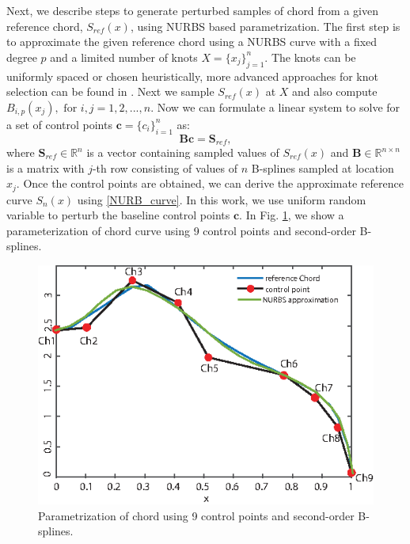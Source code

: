 \documentclass[review]{elsarticle}
\numberwithin{equation}{section}
\numberwithin{equation}{section}
\begin{document}
Next, we describe steps to generate perturbed samples of chord from a given reference chord, $S_{ref}(x)$, using NURBS based parametrization. The first step is to approximate the given reference chord using a NURBS curve with a fixed degree $p$ and a limited number of knots $X =\{x_j\}_{j=1}^n$. The knots can be uniformly spaced or chosen heuristically, more advanced approaches for knot selection can be found in \cite{LI2005791,razdan1999knot}. Next we sample $S_{ref}(x)$ at $X$ and also compute $B_{i,p}(x_j), \text{ for }i, j = 1,2, ..., n$. Now we can formulate a linear system to solve for a set of control points $\mathbf{c}=\{c_i\}_{i=1}^n$ as:
\begin{equation}\label{nurbs_inversion}
\mathbf{B}\mathbf{c} = \mathbf{S}_{ref},
\end{equation}
where $\mathbf{S}_{ref}\in\mathbb{R}^{n}$ is a vector containing sampled values of $S_{ref}(x)$ and $\mathbf{B}\in \mathbb{R}^{n\times n}$ is a matrix with $j$-th row consisting of values of $n$ B-splines sampled at location $x_j$. Once the control points are obtained, we can derive the approximate reference curve $S_n(x)$ using \eqref{NURB_curve}. In this work, we use uniform random variable to perturb the baseline control points $\mathbf{c}$. In Fig. \ref{nurbs_approx}, we show a parameterization of  chord curve using 9 control points and second-order B-splines.
\begin{figure}[h!]
\centering
\includegraphics[trim={0cm 0cm 0 0cm},clip, scale=1.3]{nurbs_approx.eps}
\caption{Parametrization of chord using 9 control points and second-order B-splines.}
\label{nurbs_approx}
\end{figure}
\end{document}
